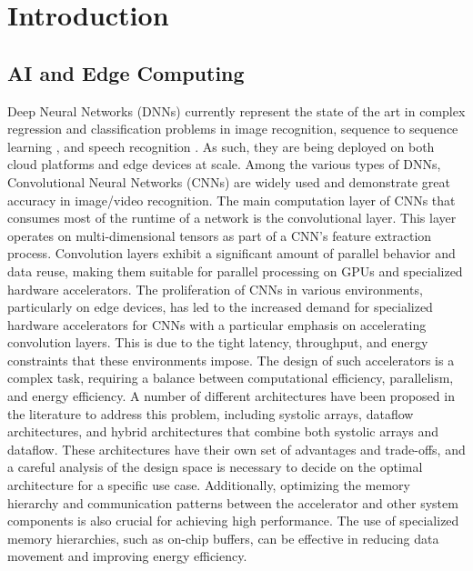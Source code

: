 
\chapter{Introduction}

\section{AI and Edge Computing}
\label{chap:intro:ai_and_edge}

Deep Neural Networks (DNNs) currently represent the state of the art in complex
regression and classification problems in image recognition, sequence to
sequence learning \cite{dnn_is_sota_seq2seq}, and speech recognition
\cite{dnn_is_sota_speech}. As such, they are being deployed on both cloud
platforms and edge devices at scale. Among the various types of DNNs,
Convolutional Neural Networks (CNNs) are widely used and demonstrate great
accuracy in image/video recognition. The main computation layer of CNNs that
consumes most of the runtime of a network is the convolutional layer. This layer
operates on multi-dimensional tensors as part of a CNN's feature extraction
process. Convolution layers exhibit a significant amount of parallel behavior
and data reuse, making them suitable for parallel processing on GPUs and
specialized hardware accelerators. The proliferation of CNNs in various
environments, particularly on edge devices, has led to the increased demand for
specialized hardware accelerators for CNNs with a particular emphasis on
accelerating convolution layers. This is due to the tight latency, throughput,
and energy constraints that these environments impose. The design of such
accelerators is a complex task, requiring a balance between computational
efficiency, parallelism, and energy efficiency. A number of different
architectures have been proposed in the literature to address this problem,
including systolic arrays, dataflow architectures, and hybrid architectures that
combine both systolic arrays and dataflow. These architectures have their own
set of advantages and trade-offs, and a careful analysis of the design space is
necessary to decide on the optimal architecture for a specific use case.
Additionally, optimizing the memory hierarchy and communication patterns between
the accelerator and other system components is also crucial for achieving high
performance. The use of specialized memory hierarchies, such as on-chip buffers,
can be effective in reducing data movement and improving energy efficiency.

